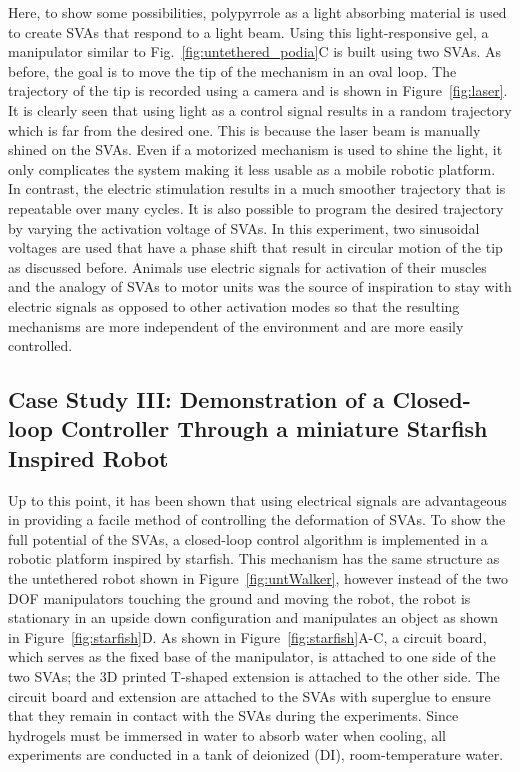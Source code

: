 Here, to show some possibilities, polypyrrole as a light absorbing material is used to create SVAs that respond to a light beam. Using this light-responsive gel, a manipulator similar to Fig.~\ref{fig:untethered_podia}C  is built using two SVAs. As before, the goal is to move the tip of the mechanism in an oval loop. The trajectory of the tip is recorded using a camera and is shown in Figure~\ref{fig:laser}. It is clearly seen that using light as a control signal results in a random trajectory which is far from the desired one. This is because the laser beam is manually shined on the SVAs. Even if a motorized mechanism is used to shine the light, it only complicates the system making it less usable as a mobile robotic platform.  In contrast, the electric stimulation results in a much smoother trajectory that is repeatable over many cycles. It is also possible to program the desired trajectory by varying the activation voltage of SVAs. In this experiment, two sinusoidal voltages are used that have a phase shift that result in circular motion of the tip as discussed before. Animals use electric signals for activation of their muscles and the analogy of SVAs to motor units was the source of inspiration to stay with electric signals as opposed to other activation modes so that the resulting mechanisms are more independent of the environment and are more easily controlled. 

\subsection{Case Study III: Demonstration of a Closed-loop Controller Through a miniature Starfish Inspired Robot}
Up to this point, it has been shown that using electrical signals are advantageous in providing a facile method of controlling the deformation of SVAs. To show the full potential of the SVAs, a closed-loop control algorithm is implemented in a robotic platform inspired by starfish. This mechanism has the same structure as the untethered robot shown in Figure~\ref{fig:untWalker}, however instead of the two DOF manipulators touching the ground and moving the robot, the robot is stationary in an upside down configuration and manipulates an object as shown in Figure~\ref{fig:starfish}D. As shown in Figure~\ref{fig:starfish}A-C, a circuit board, which serves as the fixed base of the manipulator, is attached to one side of the two SVAs; the 3D printed T-shaped extension is attached to the other side. The circuit board and extension are attached to the SVAs with superglue to ensure that they remain in contact with the SVAs during the experiments. Since hydrogels must be immersed in water to absorb water when cooling, all experiments are conducted in a tank of deionized (DI), room-temperature water.

